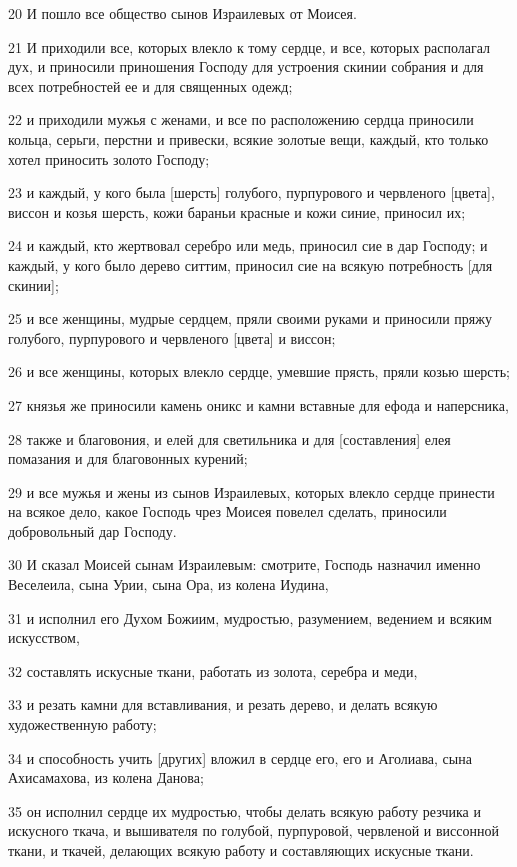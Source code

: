 \par 20 И пошло все общество сынов Израилевых от Моисея.
\par 21 И приходили все, которых влекло к тому сердце, и все, которых располагал дух, и приносили приношения Господу для устроения скинии собрания и для всех потребностей ее и для священных одежд;
\par 22 и приходили мужья с женами, и все по расположению сердца приносили кольца, серьги, перстни и привески, всякие золотые вещи, каждый, кто только хотел приносить золото Господу;
\par 23 и каждый, у кого была [шерсть] голубого, пурпурового и червленого [цвета], виссон и козья шерсть, кожи бараньи красные и кожи синие, приносил их;
\par 24 и каждый, кто жертвовал серебро или медь, приносил сие в дар Господу; и каждый, у кого было дерево ситтим, приносил сие на всякую потребность [для скинии];
\par 25 и все женщины, мудрые сердцем, пряли своими руками и приносили пряжу голубого, пурпурового и червленого [цвета] и виссон;
\par 26 и все женщины, которых влекло сердце, умевшие прясть, пряли козью шерсть;
\par 27 князья же приносили камень оникс и камни вставные для ефода и наперсника,
\par 28 также и благовония, и елей для светильника и для [составления] елея помазания и для благовонных курений;
\par 29 и все мужья и жены из сынов Израилевых, которых влекло сердце принести на всякое дело, какое Господь чрез Моисея повелел сделать, приносили добровольный дар Господу.
\par 30 И сказал Моисей сынам Израилевым: смотрите, Господь назначил именно Веселеила, сына Урии, сына Ора, из колена Иудина,
\par 31 и исполнил его Духом Божиим, мудростью, разумением, ведением и всяким искусством,
\par 32 составлять искусные ткани, работать из золота, серебра и меди,
\par 33 и резать камни для вставливания, и резать дерево, и делать всякую художественную работу;
\par 34 и способность учить [других] вложил в сердце его, его и Аголиава, сына Ахисамахова, из колена Данова;
\par 35 он исполнил сердце их мудростью, чтобы делать всякую работу резчика и искусного ткача, и вышивателя по голубой, пурпуровой, червленой и виссонной ткани, и ткачей, делающих всякую работу и составляющих искусные ткани.

